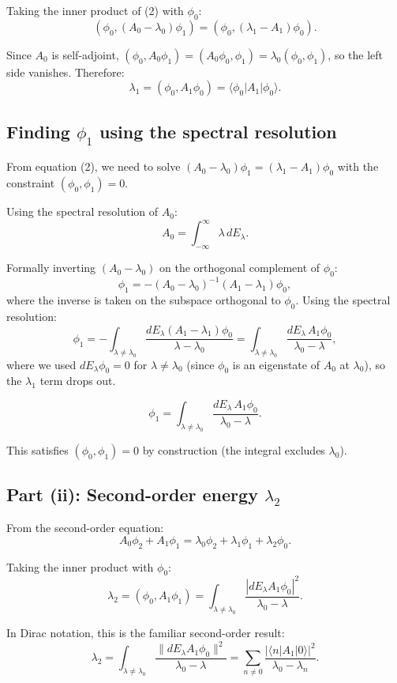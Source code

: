 \documentclass[12pt]{article}
\begin{document}
Taking the inner product of (2) with $\phi_0$:
\[
(\phi_0, (A_0 - \lambda_0)\phi_1) = (\phi_0, (\lambda_1 - A_1)\phi_0).
\]

Since $A_0$ is self-adjoint, $(\phi_0, A_0\phi_1) = (A_0\phi_0, \phi_1) = \lambda_0(\phi_0, \phi_1)$, so the left side vanishes. Therefore:
\[
\boxed{\lambda_1 = (\phi_0, A_1\phi_0) = \langle\phi_0|A_1|\phi_0\rangle.}
\]

\subsection*{Finding $\phi_1$ using the spectral resolution}

From equation (2), we need to solve $(A_0 - \lambda_0)\phi_1 = (\lambda_1 - A_1)\phi_0$ with the constraint $(\phi_0, \phi_1) = 0$.

Using the spectral resolution of $A_0$:
\[
A_0 = \int_{-\infty}^{\infty}\lambda\,dE_\lambda.
\]

Formally inverting $(A_0 - \lambda_0)$ on the orthogonal complement of $\phi_0$:
\[
\phi_1 = -(A_0 - \lambda_0)^{-1}(A_1 - \lambda_1)\phi_0,
\]
where the inverse is taken on the subspace orthogonal to $\phi_0$. Using the spectral resolution:
\[
\phi_1 = -\int_{\lambda \neq \lambda_0}\frac{dE_\lambda(A_1 - \lambda_1)\phi_0}{\lambda - \lambda_0} = \int_{\lambda \neq \lambda_0}\frac{dE_\lambda\,A_1\phi_0}{\lambda_0 - \lambda},
\]
where we used $dE_\lambda\phi_0 = 0$ for $\lambda \neq \lambda_0$ (since $\phi_0$ is an eigenstate of $A_0$ at $\lambda_0$), so the $\lambda_1$ term drops out.

\[
\boxed{\phi_1 = \int_{\lambda\neq\lambda_0}\frac{dE_\lambda\,A_1\phi_0}{\lambda_0 - \lambda}.}
\]

This satisfies $(\phi_0, \phi_1) = 0$ by construction (the integral excludes $\lambda_0$).

\subsection*{Part (ii): Second-order energy $\lambda_2$}

From the second-order equation:
\[
A_0\phi_2 + A_1\phi_1 = \lambda_0\phi_2 + \lambda_1\phi_1 + \lambda_2\phi_0.
\]

Taking the inner product with $\phi_0$:
\[
\lambda_2 = (\phi_0, A_1\phi_1) = \int_{\lambda\neq\lambda_0}\frac{|dE_\lambda A_1\phi_0|^2}{\lambda_0 - \lambda}.
\]

In Dirac notation, this is the familiar second-order result:
\[
\boxed{\lambda_2 = \int_{\lambda\neq\lambda_0}\frac{\|dE_\lambda A_1\phi_0\|^2}{\lambda_0 - \lambda} = \sum_{n\neq 0}\frac{|\langle n|A_1|0\rangle|^2}{\lambda_0 - \lambda_n}.}
\]
\end{document}
